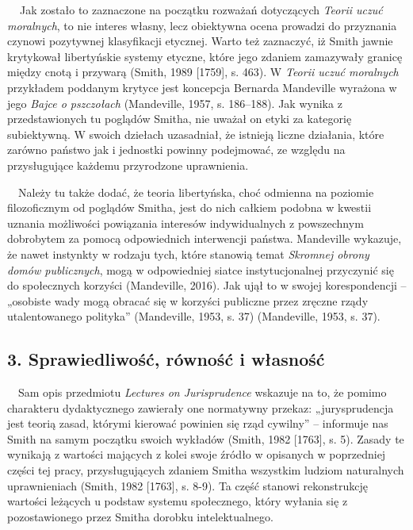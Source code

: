 \documentclass[a4paper]{article}
\begin{document}
\textbf{\ \ }Jak zostało to zaznaczone na początku rozważań dotyczących \textit{Teorii uczuć moralnych}, to nie interes własny, lecz obiektywna ocena prowadzi do przyznania czynowi pozytywnej klasyfikacji etycznej. Warto też zaznaczyć, iż Smith jawnie krytykował libertyńskie systemy etyczne, które jego zdaniem zamazywały granicę między cnotą i przywarą \label{ref:RND6UVhftNekE}(Smith, 1989 [1759], s. 463). W \textit{Teorii uczuć moralnych} przykładem poddanym krytyce jest koncepcja Bernarda Mandeville wyrażona w jego \textit{Bajce o pszczołach }\label{ref:RNDhsq78lJp7f}(Mandeville, 1957, s. 186–188). Jak wynika z przedstawionych tu poglądów Smitha, nie uważał on etyki za kategorię subiektywną. W swoich dziełach uzasadniał, że istnieją liczne działania, które zarówno państwo jak i jednostki powinny podejmować, ze względu na przysługujące każdemu przyrodzone uprawnienia.

 \ \ Należy tu także dodać, że teoria libertyńska, choć odmienna na poziomie filozoficznym od poglądów Smitha, jest do nich całkiem podobna w kwestii uznania możliwości powiązania interesów indywidualnych z powszechnym dobrobytem za pomocą odpowiednich interwencji państwa. Mandeville wykazuje, że nawet instynkty w rodzaju tych, które stanowią temat \textit{Skromnej obrony domów publicznych}, mogą w odpowiedniej siatce instytucjonalnej przyczynić się do społecznych korzyści \label{ref:RNDKGiGp2VVGh}(Mandeville, 2016). Jak ujął to w swojej korespondencji – „osobiste wady mogą obracać się w korzyści publiczne przez zręczne rządy utalentowanego polityka” \label{ref:RNDFxtQ9hz1QF}(Mandeville, 1953, s. 37) (Mandeville, 1953, s. 37). 

\subsection[3. Sprawiedliwość, równość i własność]{3. Sprawiedliwość, równość i własność}
\ \ Sam opis przedmiotu \textit{Lectures on Jurisprudence} wskazuje na to, że pomimo charakteru dydaktycznego zawierały one normatywny przekaz: „jurysprudencja jest teorią zasad, którymi kierować powinien się rząd cywilny” – informuje nas Smith na samym początku swoich wykładów \label{ref:RNDscYVjbho0w}(Smith, 1982 [1763], s. 5). Zasady te wynikają z wartości mających z kolei swoje źródło w opisanych w poprzedniej części tej pracy, przysługujących zdaniem Smitha wszystkim ludziom naturalnych uprawnieniach \label{ref:RND2YqiGCGi5H}(Smith, 1982 [1763], s. 8-9). Ta część stanowi rekonstrukcję wartości leżących u podstaw systemu społecznego, który wyłania się z pozostawionego przez Smitha dorobku intelektualnego.
\end{document}
